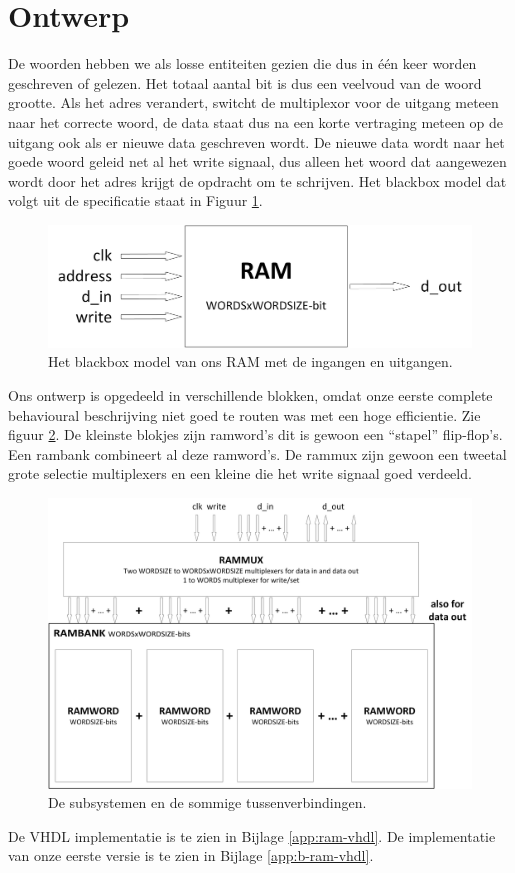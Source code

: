 \documentclass{scrartcl}  %
\begin{document}
\section{Ontwerp}
De woorden hebben we als losse entiteiten gezien die dus in één keer worden geschreven of gelezen.
Het totaal aantal bit is dus een veelvoud van de woord grootte.
Als het adres verandert, switcht de multiplexor voor de uitgang meteen naar het correcte woord, de data staat dus na een korte vertraging meteen op de uitgang ook als er nieuwe data geschreven wordt.
De nieuwe data wordt naar het goede woord geleid net al het write signaal, dus alleen het woord dat aangewezen wordt door het adres krijgt de opdracht om te schrijven.
Het blackbox model dat volgt uit de specificatie staat in Figuur \ref{fig:blackbox-ram}.
\begin{figure}[H]
\centering
		\includegraphics[width=\textwidth]{resource/blackbox-ram}
		\caption{Het blackbox model van ons RAM met de ingangen en uitgangen.}
		\label{fig:blackbox-ram}
\end{figure}
Ons ontwerp is opgedeeld in verschillende blokken, omdat onze eerste complete behavioural beschrijving niet goed te routen was met een hoge efficientie. Zie figuur \ref{fig:subsystems-ram}.
De kleinste blokjes zijn ramword’s dit is gewoon een “stapel” flip-flop’s.
Een rambank combineert al deze ramword’s.
De rammux zijn gewoon een tweetal grote selectie multiplexers en een kleine die het write signaal goed verdeeld.
\begin{figure}[H]
\centering
		\includegraphics[width=\textwidth]{resource/subsystems-ram}
		\caption{De subsystemen en de sommige tussenverbindingen.}
		\label{fig:subsystems-ram}
\end{figure}
De VHDL implementatie is te zien in Bijlage \ref{app:ram-vhdl}. De implementatie van onze eerste versie is te zien in Bijlage \ref{app:b-ram-vhdl}.
\end{document}
